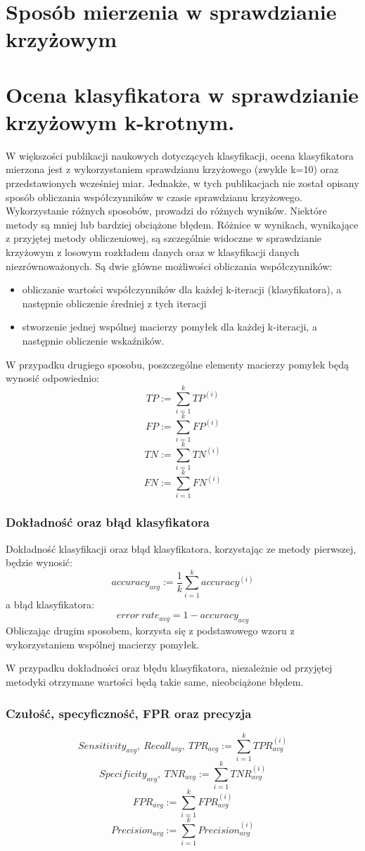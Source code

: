 \section{Sposób mierzenia w sprawdzianie krzyżowym}
\section{Ocena klasyfikatora w sprawdzianie krzyżowym k-krotnym.}
W większości publikacji naukowych dotyczących klasyfikacji, ocena klasyfikatora mierzona jest z wykorzystaniem sprawdzianu krzyżowego (zwykle k=10) oraz przedstawionych wcześniej miar. Jednakże, w tych publikacjach nie został opisany sposób obliczania współczynników w czasie sprawdzianu krzyżowego. Wykorzystanie różnych sposobów, prowadzi do różnych wyników. Niektóre metody są mniej lub bardziej obciążone błędem. Różnice w wynikach, wynikające z przyjętej metody obliczeniowej, są szczególnie widoczne w sprawdzianie krzyżowym z losowym rozkładem danych oraz w klasyfikacji danych niezrównoważonych. Są dwie główne możliwości obliczania współczynników:
\begin{itemize}
	\item obliczanie wartości współczynników dla każdej k-iteracji (klasyfikatora), a następnie obliczenie średniej z tych iteracji
	\item stworzenie jednej wspólnej macierzy pomyłek dla każdej k-iteracji, a następnie obliczenie wskaźników.
\end{itemize}
W przypadku drugiego sposobu, poszczególne elementy macierzy pomyłek będą wynosić odpowiednio:
\[TP := \sum_{i=1}^{k} TP^{(i)}\]
\[FP := \sum_{i=1}^{k} FP^{(i)}\]
\[TN := \sum_{i=1}^{k} TN^{(i)}\]
\[FN := \sum_{i=1}^{k} FN^{(i)}\]
\subsubsection{Dokładność oraz błąd klasyfikatora}
Dokładność klasyfikacji oraz błąd klasyfikatora, korzystając ze metody pierwszej, będzie wynosić:
\[accuracy_{avg} := \frac{1}{k} \sum_{i=1}^{k} accuracy^{(i)}\]
a błąd klasyfikatora:
\[error\ rate_{avg} = 1 - accuracy_{avg}\]
Obliczając drugim sposobem, korzysta się z podstawowego wzoru z wykorzystaniem wspólnej macierzy pomyłek. \par
W przypadku dokładności oraz błędu klasyfikatora, niezależnie od przyjętej metodyki otrzymane wartości będą takie same, nieobciążone błędem.
\subsubsection{Czułość, specyficzność, FPR oraz precyzja}
\[Sensitivity_{avg},\ Recall_{avg},\ TPR_{avg} := \sum_{i=1}^{k} TPR_{avg}^{(i)}\]
\[Specificity_{avg},\ TNR_{avg} := \sum_{i=1}^{k} TNR_{avg}^{(i)}\]
\[FPR_{avg} := \sum_{i=1}^{k} FPR_{avg}^{(i)}\]
\[Precision_{avg} := \sum_{i=1}^{k} Precision_{avg}^{(i)}\]
